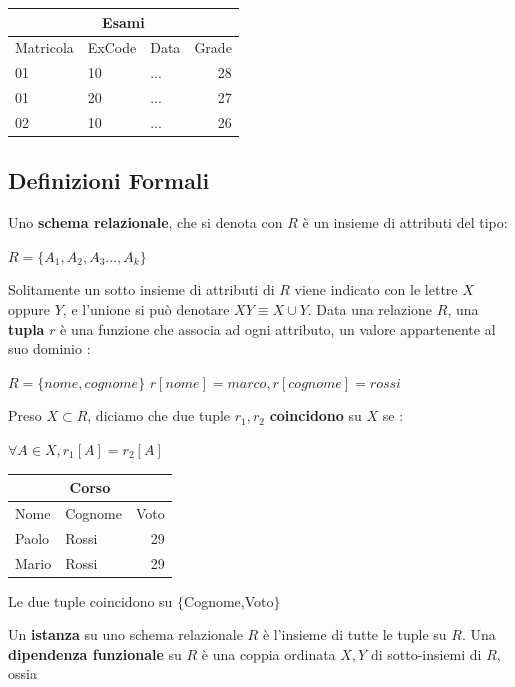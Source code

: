 \documentclass[12pt, letterpaper]{article}
\begin{document}
\begin{center}
    \begin{tabular}{|l|l|l|r|}
        \hline
        \multicolumn{4}{|c|}{Esami}   \\\hline
        Matricola  & ExCode & Data & Grade  \\ \hline
        01  & 10 & ... & 28  \\ \hline
        01  & 20 & ... & 27  \\ \hline
        02  & 10 & ... & 26  \\ \hline
        \end{tabular}
\end{center}
\subsection{Definizioni Formali}
Uno \textbf{schema relazionale}, che si denota con \(R\) è un insieme di attributi del tipo:\begin{center}
    \(R=\{A_1,A_2,A_3...,A_k\}\)
\end{center}
Solitamente un sotto insieme di attributi di \(R\) viene indicato con le lettre \(X\) oppure \(Y\),
e l'unione si può denotare \(XY\equiv X\cup Y\). 
Data una relazione \(R\), una \textbf{tupla} \(r\) è una funzione che associa ad ogni attributo, 
un valore appartenente al suo dominio : \begin{center}
    \(
      R=\{nome,cognome\}\)   \(r[nome]=marco, r[cognome]=rossi  
    \)
\end{center}
Preso \(X\subset R\), diciamo che due tuple \(r_1,r_2\) \textbf{coincidono} su \(X\) se :\begin{center}
    \(\forall A\in X,r_1[A]=r_2[A]\)
\end{center}
\begin{center}
    \begin{tabular}{|l|l|r|}
        \hline
        \multicolumn{3}{|c|}{Corso}   \\\hline
        Nome  & Cognome & Voto  \\ \hline
        Paolo  & Rossi & 29 \\ \hline
        Mario  & Rossi & 29\\ \hline
        \end{tabular}
        Le due tuple coincidono su \(\{\)Cognome,Voto\(\}\)
\end{center}
Un \textbf{istanza} su uno schema relazionale \(R\) è l'insieme di tutte le tuple su \(R\).
Una \textbf{dipendenza funzionale} su \(R\) è una coppia ordinata \(X,Y\) di sotto-insiemi di \(R\), ossia 
\end{document}
